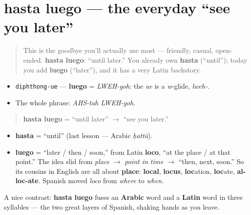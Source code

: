 \section[hasta luego]{hasta luego — the everyday \textquotedblleft{}see you later\textquotedblright{}}

\label{lesson:ES-C05-hasta-luego}



\begin{quote}
This is the goodbye you'll actually use most — friendly, casual, open-ended. \textbf{hasta luego}: \textquotedblleft{}until later.\textquotedblright{} You already own \textbf{hasta} (\textquotedblleft{}until\textquotedblright{}); today you add \textbf{luego} (\textquotedblleft{}later\textquotedblright{}), and it has a very Latin backstory.
\end{quote}

\begin{sounds}
\begin{itemize}
\raggedright
  \item \texttt{diphthong-ue} — \textbf{luego} = \emph{LWEH-goh}: the \emph{ue} is a \emph{w}-glide, \emph{lweh-}.
  \item The whole phrase: \emph{AHS-tah LWEH-goh}.
\end{itemize}
\end{sounds}

\begin{cousinweb}
\begin{quote}
\textbf{hasta luego} = \textquotedblleft{}until later\textquotedblright{} $\to$ \textquotedblleft{}see you later.\textquotedblright{}
\end{quote}

\begin{itemize}
\raggedright
  \item \textbf{hasta} = \textquotedblleft{}until\textquotedblright{} (last lesson — Arabic \emph{ḥattā}).
  \item \textbf{luego} = \textquotedblleft{}later / then / soon,\textquotedblright{} from Latin \textbf{loco}, \textquotedblleft{}at the place / at that point.\textquotedblright{} The idea slid from \emph{place} $\to$ \emph{point in time} $\to$ \textquotedblleft{}then, next, soon.\textquotedblright{} So its cousins in English are all about \textbf{place}: \textbf{local}, \textbf{locus}, \textbf{loc}ation, \textbf{loc}ate, \textbf{al-loc-ate}. Spanish moved \emph{loco} from \emph{where} to \emph{when}.
\end{itemize}

A nice contrast: \textbf{hasta luego} fuses an \textbf{Arabic} word and a \textbf{Latin} word in three syllables — the two great layers of Spanish, shaking hands as you leave.
\end{cousinweb}

